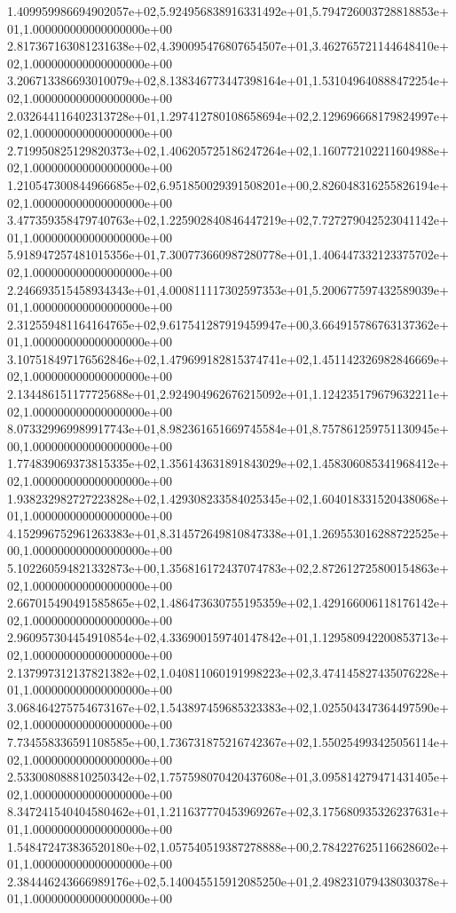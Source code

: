 1.409959986694902057e+02,5.924956838916331492e+01,5.794726003728818853e+01,1.000000000000000000e+00
2.817367163081231638e+02,4.390095476807654507e+01,3.462765721144648410e+02,1.000000000000000000e+00
3.206713386693010079e+02,8.138346773447398164e+01,1.531049640888472254e+02,1.000000000000000000e+00
2.032644116402313728e+01,1.297412780108658694e+02,2.129696668179824997e+02,1.000000000000000000e+00
2.719950825129820373e+02,1.406205725186247264e+02,1.160772102211604988e+02,1.000000000000000000e+00
1.210547300844966685e+02,6.951850029391508201e+00,2.826048316255826194e+02,1.000000000000000000e+00
3.477359358479740763e+02,1.225902840846447219e+02,7.727279042523041142e+01,1.000000000000000000e+00
5.918947257481015356e+01,7.300773660987280778e+01,1.406447332123375702e+02,1.000000000000000000e+00
2.246693515458934343e+01,4.000811117302597353e+01,5.200677597432589039e+01,1.000000000000000000e+00
2.312559481164164765e+02,9.617541287919459947e+00,3.664915786763137362e+01,1.000000000000000000e+00
3.107518497176562846e+02,1.479699182815374741e+02,1.451142326982846669e+02,1.000000000000000000e+00
2.134486151177725688e+01,2.924904962676215092e+01,1.124235179679632211e+02,1.000000000000000000e+00
8.073329969989917743e+01,8.982361651669745584e+01,8.757861259751130945e+00,1.000000000000000000e+00
1.774839069373815335e+02,1.356143631891843029e+02,1.458306085341968412e+02,1.000000000000000000e+00
1.938232982727223828e+02,1.429308233584025345e+02,1.604018331520438068e+01,1.000000000000000000e+00
4.152996752961263383e+01,8.314572649810847338e+01,1.269553016288722525e+00,1.000000000000000000e+00
5.102260594821332873e+00,1.356816172437074783e+02,2.872612725800154863e+02,1.000000000000000000e+00
2.667015490491585865e+02,1.486473630755195359e+02,1.429166006118176142e+02,1.000000000000000000e+00
2.960957304454910854e+02,4.336900159740147842e+01,1.129580942200853713e+02,1.000000000000000000e+00
2.137997312137821382e+02,1.040811060191998223e+02,3.474145827435076228e+01,1.000000000000000000e+00
3.068464275754673167e+02,1.543897459685323383e+02,1.025504347364497590e+02,1.000000000000000000e+00
7.734558336591108585e+00,1.736731875216742367e+02,1.550254993425056114e+02,1.000000000000000000e+00
2.533008088810250342e+02,1.757598070420437608e+01,3.095814279471431405e+02,1.000000000000000000e+00
8.347241540404580462e+01,1.211637770453969267e+02,3.175680935326237631e+01,1.000000000000000000e+00
1.548472473836520180e+02,1.057540519387278888e+00,2.784227625116628602e+01,1.000000000000000000e+00
2.384446243666989176e+02,5.140045515912085250e+01,2.498231079438030378e+01,1.000000000000000000e+00
